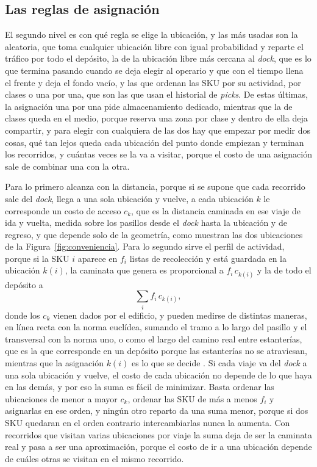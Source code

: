 \subsection{Las reglas de asignación}

El segundo nivel es con qué regla se elige la ubicación, y las más usadas son la aleatoria, que toma cualquier ubicación libre con igual probabilidad y reparte el tráfico por todo el depósito, la de la ubicación libre más cercana al \emph{dock}, que es lo que termina pasando cuando se deja elegir al operario y que con el tiempo llena el frente y deja el fondo vacío, y las que ordenan las SKU por su actividad, por clases o una por una, que son las que usan el historial de \emph{picks}.
De estas últimas, la asignación una por una pide almacenamiento dedicado, mientras que la de clases queda en el medio, porque reserva una zona por clase y dentro de ella deja compartir, y para elegir con cualquiera de las dos hay que empezar por medir dos cosas, qué tan lejos queda cada ubicación del punto donde empiezan y terminan los recorridos, y cuántas veces se la va a visitar, porque el costo de una asignación sale de combinar una con la otra.

Para lo primero alcanza con la distancia, porque si se supone que cada recorrido sale del \emph{dock}, llega a una sola ubicación y vuelve, a cada ubicación $k$ le corresponde un costo de acceso $c_k$, que es la distancia caminada en ese viaje de ida y vuelta, medida sobre los pasillos desde el \emph{dock} hasta la ubicación y de regreso, y que depende solo de la geometría, como muestran las dos ubicaciones de la Figura~\ref{fig:conveniencia}.
Para lo segundo sirve el perfil de actividad, porque si la SKU $i$ aparece en $f_i$ listas de recolección y está guardada en la ubicación $k(i)$, la caminata que genera es proporcional a $f_i\, c_{k(i)}$ y la de todo el depósito a
\begin{equation}
    \sum_i f_i\, c_{k(i)},
    \label{eq:costo-lineal}
\end{equation}
donde los $c_k$ vienen dados por el edificio, y pueden medirse de distintas maneras, en línea recta con la norma euclídea, sumando el tramo a lo largo del pasillo y el transversal con la norma uno, o como el largo del camino real entre estanterías, que es la que corresponde en un depósito porque las estanterías no se atraviesan, mientras que la asignación $k(i)$ es lo que se decide \citep[sección~6.2]{bartholdi2014warehouse}.
Si cada viaje va del \emph{dock} a una sola ubicación y vuelve, el costo de cada ubicación no depende de lo que haya en las demás, y por eso la suma es fácil de minimizar.
Basta ordenar las ubicaciones de menor a mayor $c_k$, ordenar las SKU de más a menos $f_i$ y asignarlas en ese orden, y ningún otro reparto da una suma menor, porque si dos SKU quedaran en el orden contrario intercambiarlas nunca la aumenta.
Con recorridos que visitan varias ubicaciones por viaje la suma deja de ser la caminata real y pasa a ser una aproximación, porque el costo de ir a una ubicación depende de cuáles otras se visitan en el mismo recorrido.

